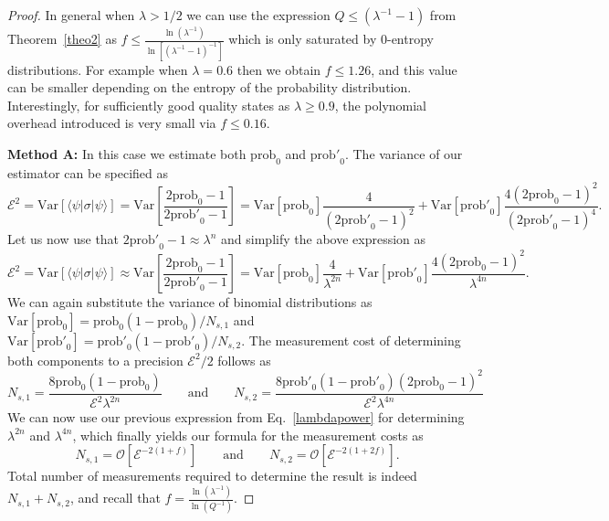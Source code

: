 \documentclass[aps,prx,showpacs,twocolumn,reprint]{revtex4-2}
\newcommand{\var}{\mathrm{Var}}
\newcommand{\prob}{\mathrm{prob}_0}
\begin{document}
{\begin{proof}
	In general when $\lambda>1/2$ we can use the expression $Q\leq(\lambda^{-1}-1)$ from Theorem~\ref{theo2} as
	$f \leq \frac{\ln(\lambda^{-1})}{\ln[(\lambda^{-1} -1)^{-1}] }$ which is only saturated by $0$-entropy distributions.
	For example when $\lambda=0.6$ then we obtain $f \leq 1.26$, and this value can be smaller depending on
	the entropy of the probability distribution. Interestingly, for sufficiently good quality states as $\lambda \geq 0.9$,
	the polynomial overhead introduced is very small via $f \leq 0.16$.
	
	\textbf{Method A:} In this case we estimate both $\prob$ and $\mathrm{prob'}_0$. The variance of our estimator can be specified
	as
	\begin{equation*}
	\mathcal{E}^2=
	\var[\langle\psi |\sigma | \psi \rangle ]
		=
	\var[\frac{2\mathrm{prob}_0-1}{2\mathrm{prob'}_0-1}]
	= \var[\mathrm{prob}_0]  \frac{4}{(2\mathrm{prob'}_0-1)^{2}}
	+ \var[\mathrm{prob'}_0]  \frac{ 4 (2\mathrm{prob}_0-1)^2}{ (2\mathrm{prob'}_0-1)^{4} }.
	\end{equation*}
	Let us now use that $2\mathrm{prob'}_0-1 \approx \lambda^n$ and simplify the above expression
	as
	\begin{equation*}
	\mathcal{E}^2=
	\var[\langle\psi |\sigma | \psi \rangle ]
	\approx 
	\var[\frac{2\mathrm{prob}_0-1}{2\mathrm{prob'}_0-1}]
	= \var[\mathrm{prob}_0]  \frac{4}{\lambda^{2n}}
	+ \var[\mathrm{prob'}_0]  \frac{ 4 (2\mathrm{prob}_0-1)^2}{ \lambda^{4n} }.
	\end{equation*}
	We can again substitute the variance of binomial distributions as
	$\var[\mathrm{prob}_0] = \mathrm{prob}_0(1-\mathrm{prob}_0)/N_{s,1}$
	and $\var[\mathrm{prob'}_0] = \mathrm{prob'}_0(1-\mathrm{prob'}_0)/N_{s,2}$.
	The measurement cost of determining both components to a precision
	$\mathcal{E}^2/2$ follows as
	\begin{equation*}
	N_{s,1} = \frac{8\mathrm{prob}_0(1-\mathrm{prob}_0)}{\mathcal{E}^2 \lambda^{2n}}
	\quad \quad \text{and} \quad \quad
	N_{s,2} = 	\frac{ 8 \mathrm{prob'}_0(1-\mathrm{prob'}_0) (2\mathrm{prob}_0-1)^2}{ \mathcal{E}^2 \lambda^{4n} }
	\end{equation*}
	We can now use our previous expression from Eq.~\eqref{lambdapower}
	for determining $\lambda^{2n}$ and  $\lambda^{4n}$,
	which finally yields our formula for the measurement costs as
	\begin{equation}
	N_{s,1} = \mathcal{O}[ \mathcal{E}^{-2 (1+f ) } ]
	\quad \quad \text{and} \quad \quad
	N_{s,2} = \mathcal{O}[ \mathcal{E}^{-2 (1+2f) } ].
	\end{equation}
	Total number of measurements required to determine
	the result is indeed $N_{s,1} + N_{s,2}$,
	and recall that $f = \frac{\ln(\lambda^{-1})}{\ln (Q^{-1})}$.
	


\end{proof}}
\end{document}

